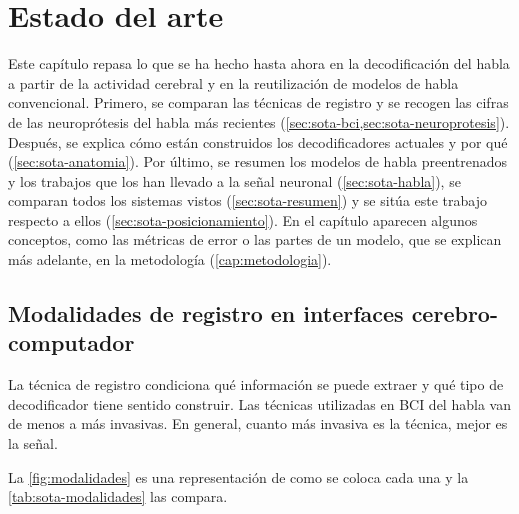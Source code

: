 
\chapter{Estado del arte}
\label{cap:estado-del-arte}

Este capítulo repasa lo que se ha hecho hasta ahora en la decodificación del habla a partir de la actividad cerebral y en la reutilización de modelos de habla convencional. Primero, se comparan las técnicas de registro y se recogen las cifras de las neuroprótesis del habla más recientes (\cref{sec:sota-bci,sec:sota-neuroprotesis}). Después, se explica cómo están construidos los decodificadores actuales y por qué (\cref{sec:sota-anatomia}). Por último, se resumen los modelos de habla preentrenados y los trabajos que los han llevado a la señal neuronal (\cref{sec:sota-habla}), se comparan todos los sistemas vistos (\cref{sec:sota-resumen}) y se sitúa este trabajo respecto a ellos (\cref{sec:sota-posicionamiento}). En el capítulo aparecen algunos conceptos, como las métricas de error o las partes de un modelo, que se explican más adelante, en la metodología (\cref{cap:metodologia}).

\section{Modalidades de registro en interfaces cerebro-computador}
\label{sec:sota-bci}

La técnica de registro condiciona qué información se puede extraer y qué tipo de decodificador tiene sentido construir. Las técnicas utilizadas en BCI del habla van de menos a más invasivas. En general, cuanto más invasiva es la técnica, mejor es la señal.

La \cref{fig:modalidades} es una representación de como se coloca cada una y la \cref{tab:sota-modalidades} las compara.

